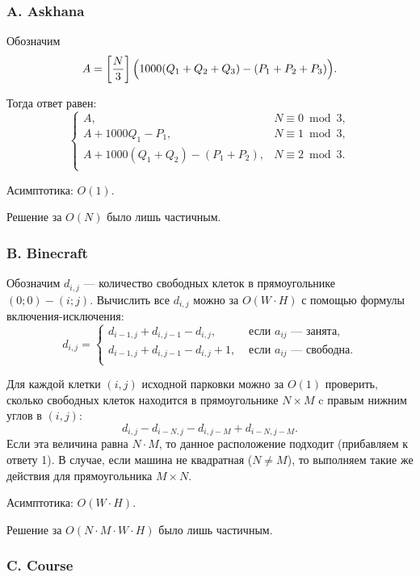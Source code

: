 \subsubsection*{A. Askhana}


Обозначим $$A = \left[ \frac{N}{3} \right] \Bigl(1000 (Q_1 + Q_2 + Q_3) - (P_1 + P_2 + P_3) \Bigr).$$

Тогда ответ равен:
$$
\begin{cases}
A, & N \equiv 0 \bmod 3,\\
A + 1000 Q_1 - P_1, & N \equiv 1 \bmod 3,\\
A + 1000 (Q_1 + Q_2) - (P_1 + P_2), & N \equiv 2 \bmod 3.\\
\end{cases}
$$

Асимптотика: $O(1)$. 

Решение за $O(N)$ было лишь частичным.

\subsubsection*{B. Binecraft}



Обозначим $d_{i,j}$ --- количество свободных клеток в прямоугольнике $(0; 0) - (i; j)$. Вычислить все $d_{i,j}$ можно за $O(W \cdot H)$ с помощью формулы включения-исключения:
$$
d_{i,j} = 
\begin{cases}
d_{i-1, j} + d_{i, j-1} - d_{i, j}, & \text{ если } a_{ij} \text{ --- занята,}\\
d_{i-1, j} + d_{i, j-1} - d_{i, j} + 1, & \text{ если } a_{ij} \text{ --- свободна.}\\
\end{cases}
$$

Для каждой клетки $(i, j)$ исходной парковки можно за $O(1)$ проверить, сколько свободных клеток находится в прямоугольнике $N \times M$ c правым нижним углов в $(i, j)$:
$$d_{i,j} - d_{i - N, j} - d_{i, j - M} + d_{i - N, j - M}.$$
Если эта величина равна $N \cdot M$, то данное расположение подходит (прибавляем к ответу 1). В случае, если машина не квадратная ($N \neq M$), то выполняем такие же действия для прямоугольника $M \times N$.

Асимптотика: $O(W \cdot H)$. 

Решение за $O(N \cdot M \cdot W \cdot H)$ было лишь частичным.

\subsubsection*{C. Course}


